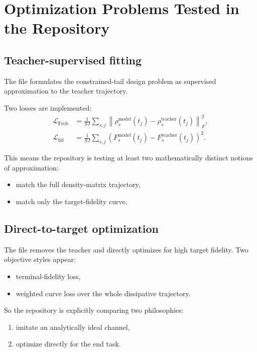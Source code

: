 \documentclass[11pt,a4paper]{article}
\begin{document}
\section{Optimization Problems Tested in the Repository}

\subsection{Teacher-supervised fitting}
The file  formulates the constrained-tail design problem as supervised approximation to the teacher trajectory.

Two losses are implemented:
\begin{align*}
\mathcal{L}_{\mathrm{Frob}}
&=
\frac{1}{SJ}\sum_{s,j}
\left\lVert
\rho^{\mathrm{model}}_{s}(t_j)
- \rho^{\mathrm{teacher}}_{s}(t_j)
\right\rVert_F^2, \\
\mathcal{L}_{\mathrm{fid}}
&=
\frac{1}{SJ}\sum_{s,j}
\left(
F^{\mathrm{model}}_{s}(t_j)
- F^{\mathrm{teacher}}_{s}(t_j)
\right)^2.
\end{align*}

This means the repository is testing at least two mathematically distinct notions of approximation:
\begin{itemize}
  \item match the full density-matrix trajectory,
  \item match only the target-fidelity curve.
\end{itemize}

\subsection{Direct-to-target optimization}
The file  removes the teacher and directly optimizes for high target fidelity. Two objective styles appear:
\begin{itemize}
  \item terminal-fidelity loss,
  \item weighted curve loss over the whole dissipative trajectory.
\end{itemize}

So the repository is explicitly comparing two philosophies:
\begin{enumerate}[label=\alph*.]
  \item imitate an analytically ideal channel,
  \item optimize directly for the end task.
\end{enumerate}
\end{document}
